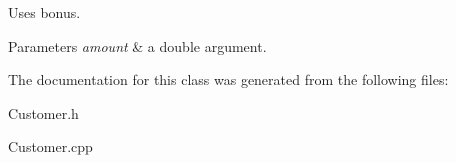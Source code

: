 Uses bonus. 


\begin{DoxyParams}{Parameters}
{\em amount} & a double argument. \\
\hline
\end{DoxyParams}


The documentation for this class was generated from the following files\+:\begin{DoxyCompactItemize}
\item 
Customer.\+h\item 
Customer.\+cpp\end{DoxyCompactItemize}
